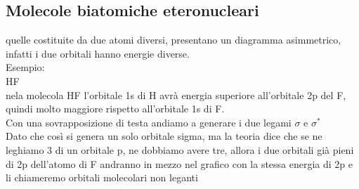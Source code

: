 \subsection{Molecole biatomiche eteronucleari}
quelle costituite da due atomi diversi, presentano un diagramma asimmetrico, infatti i due orbitali hanno energie diverse. \\
Esempio: \\
HF\\
nela molecola HF l’orbitale 1s di H avrà energia superiore all’orbitale 2p del F, quindi molto maggiore rispetto all’orbitale 1s di F.\\
Con una sovrapposizione di testa andiamo a generare i due legami $\sigma$ e $\sigma^*$\\
Dato che così si genera un solo orbitale sigma, ma la teoria dice che se ne leghiamo 3 di un orbitale p, ne dobbiamo avere tre, allora i due orbitali già pieni di 2p dell’atomo di F andranno in mezzo nel grafico con la stessa energia di 2p e li chiameremo orbitali molecolari non leganti 
